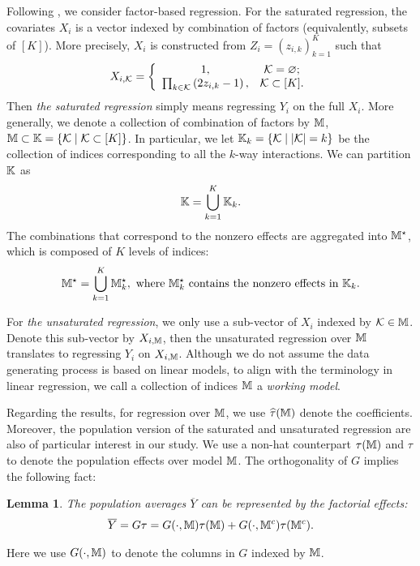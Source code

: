 \documentclass[12pt]{article}
\newtheorem{lemma}{Lemma}
\begin{document}
Following \cite{zhao2021regression}, we consider factor-based regression. For the saturated regression, the covariates ${X}_i$ is a vector indexed by combination of factors (equivalently, subsets of $[K]$). More precisely, ${X}_i$ is constructed from ${Z}_i = (z_{i,k})_{k=1}^K$ such that 
\begin{align*}
    {X}_{i,\mathcal{K}} = \left\{
    \begin{array}{cc}
        1, & {\mathcal{K}} = \varnothing; \\
        \prod_{k\in\mathcal{K}}\left(2z_{i,k}-1\right), & {\mathcal{K}}\subset [K].  
    \end{array}
    \right.
\end{align*}
Then \textit{the saturated regression} simply means regressing $Y_i$ on the full ${X}_i$. More generally, we denote a collection of combination of factors by ${\mathbb{M}}$, ${\mathbb{M}} \subset \mathbb{K} = \{\mathcal{K}\mid \mathcal{K}\subset[K]\}$. In particular, we let ${\mathbb{K}}_k = \{{\mathcal{K}}\mid |{\mathcal{K}}| = k\}$ be the collection of indices corresponding to all the $k$-way interactions. We can partition ${\mathbb{K}}$ as
\begin{align*}
    {\mathbb{K}} = \bigcup_{k=1}^K {\mathbb{K}}_k.
\end{align*}
 The combinations that correspond to the nonzero effects are aggregated into ${\mathbb{M}}^\star$, which is composed of $K$ levels of indices:
\begin{align*}
{\mathbb{M}}^\star = \bigcup_{k=1}^{K} {\mathbb{M}}_k^\star, \text{ where } {\mathbb{M}}_k^\star \text{ contains the nonzero effects in } {\mathbb{K}}_k.
\end{align*}


  For \textit{the unsaturated regression}, we only use a sub-vector of ${X}_i$ indexed by $\mathcal{K}\in{\mathbb{M}}$. Denote this sub-vector by ${X}_{i,{\mathbb{M}}}$, then the unsaturated regression over ${\mathbb{M}}$ translates to regressing $Y_i$ on ${X}_{i,{\mathbb{M}}}$. Although we do not assume the data generating process is based on linear models, to align with the terminology in linear regression, we call a collection of indices ${\mathbb{M}}$ a \textit{working model}.

Regarding the results, for regression over ${\mathbb{M}}$,  we use $\widehat{\tau}({\mathbb{M}})$ denote the coefficients.   Moreover, the population version of the saturated and unsaturated regression are also of particular interest in our study. We use a non-hat counterpart ${\tau}({\mathbb{M}}) $ and $\tau$ to denote the population effects over model ${\mathbb{M}}$. The orthogonality of $G$ implies the following fact:
\begin{lemma}
The population averages $\overline{Y}$ can be represented by the factorial effects:
\begin{align}\label{eqn:reparametrization}
    \overline{Y} = G\tau = G(\cdot, {\mathbb{M}})\tau({\mathbb{M}}) + G(\cdot, {\mathbb{M}}^c)\tau({\mathbb{M}}^c).
\end{align}
\end{lemma}
Here we use $G(\cdot,{\mathbb{M}})$ to denote the columns in $G$ indexed by ${\mathbb{M}}$. 
\end{document}
